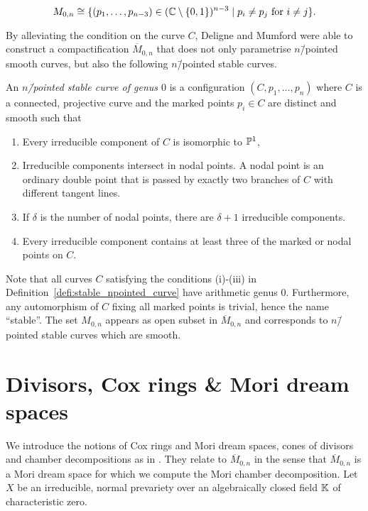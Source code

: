 $$M_{0,n} \cong \{(p_1,\dots,p_{n-3})\in (\mathbb{C} \setminus \{0,1\})^{n-3} \mid p_i\neq p_j\ \mathrm{for}\ i\neq j\}.$$

By alleviating the condition on the curve $C$, Deligne and Mumford were able to construct a compactification $\overline{M}_{0,n}$ that does not only parametrise $n$\=/pointed smooth curves, but also the following $n$\=/pointed stable curves. \cite{curves_of_a_given_genus}
%

\begin{defi}
	\label{defi:stable_npointed_curve}
	An \emph{$n$\=/pointed stable curve of genus $0$} is a configuration $(C,p_1,\dots,p_n)$ where $C$ is a connected, projective curve and the marked points $p_i\in C$ are distinct and smooth such that
	\begin{enumerate}[label={\upshape(\roman*)}]
		\item Every irreducible component of $C$ is isomorphic to $\mathbb{P}^1$,
		\item Irreducible components intersect in nodal points. A nodal point is an ordinary double point that is passed by exactly two branches of $C$ with different tangent lines.
		\item If $\delta$ is the number of nodal points, there are $\delta + 1 $ irreducible components.
		\item Every irreducible component contains at least three of the marked or nodal points on $C$.
	\end{enumerate}
\end{defi}

\begin{remark}
	Note that all curves $C$ satisfying the conditions (i)-(iii) in Definition~\ref{defi:stable_npointed_curve} have arithmetic genus $0$. Furthermore, any automorphism of $C$ fixing all marked points is trivial, hence the name ``stable''. The set $M_{0,n}$ appears as open subset in $\overline{M}_{0,n}$ and corresponds to $n$\=/pointed stable curves which are smooth.
\end{remark}

\section{Divisors, Cox rings \& Mori dream spaces}

We introduce the notions of Cox rings and Mori dream spaces, cones of divisors and chamber decompositions as in \cite{cox_rings}. They relate to $\overline{M}_{0,n}$ in the sense that $\overline{M}_{0,n}$ is a Mori dream space for which we compute the Mori chamber decomposition. Let $X$ be an irreducible, normal prevariety over an algebraically closed field $\mathbb{K}$ of characteristic zero.

